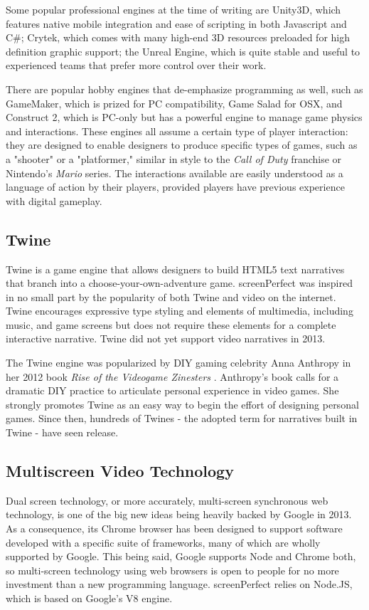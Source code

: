 Some popular professional engines at the time of writing are Unity3D, which features native mobile integration and ease of scripting in both Javascript and C\#; Crytek, which comes with many high-end 3D resources preloaded for high definition graphic support; the Unreal Engine, which is quite stable and useful to experienced teams that prefer more control over their work.

There are popular hobby engines that de-emphasize programming as well, such as GameMaker, which is prized for PC compatibility, Game Salad for OSX, and Construct 2, which is PC-only but has a powerful engine to manage game physics and interactions. These engines all assume a certain type of player interaction: they are designed to enable designers to produce specific types of games, such as a "shooter" or a "platformer," similar in style to the \textit{Call of Duty} franchise or Nintendo's \textit{Mario} series. The interactions available are easily understood as a language of action by their players, provided players have previous experience with digital gameplay.

\subsection{Twine}
Twine is a game engine that allows designers to build HTML5 text narratives that branch into a choose-your-own-adventure game. screenPerfect was inspired in no small part by the popularity of both Twine and video on the internet. Twine encourages expressive type styling and elements of multimedia, including music, and game screens but does not require these elements for a complete interactive narrative. Twine did not yet support video narratives in 2013.

The Twine engine was popularized by DIY gaming celebrity Anna Anthropy in her 2012 book \textit{Rise of the Videogame Zinesters} \parencite{anthropy}. Anthropy's book calls for a dramatic DIY practice to articulate personal experience in video games. She strongly promotes Twine as an easy way to begin the effort of designing personal games. Since then, hundreds of Twines - the adopted term for narratives built in Twine - have seen release.

\subsection{Multiscreen Video Technology}
Dual screen technology, or more accurately, multi-screen synchronous web technology, is one of the big new ideas being heavily backed by Google in 2013. As a consequence, its Chrome browser has been designed to support software developed with a specific suite of frameworks, many of which are wholly supported by Google. 
This being said, Google supports Node and Chrome both, so multi-screen technology using web browsers is open to people for no more investment than a new programming language. screenPerfect relies on Node.JS, which is based on Google's V8 engine.

